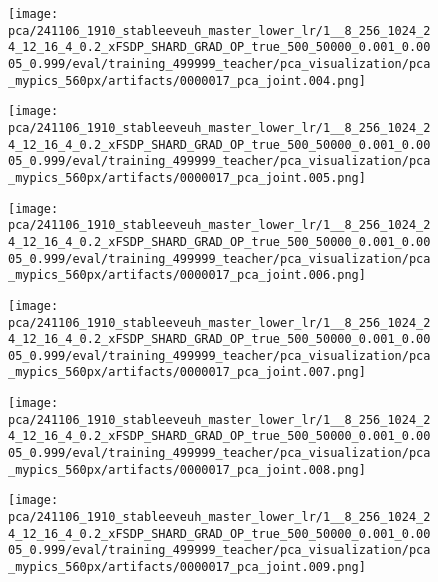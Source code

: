 \begin{figure*}[p]
\begin{subfigure}[t]{0.097\textwidth}
    \end{subfigure}\hfill
    \begin{subfigure}[t]{0.097\textwidth}
        \centering
        \texttt{[image: pca/241106\_1910\_stableeveuh\_master\_lower\_lr/1\_\_8\_256\_1024\_24\_12\_16\_4\_0.2\_xFSDP\_SHARD\_GRAD\_OP\_true\_500\_50000\_0.001\_0.0005\_0.999/eval/training\_499999\_teacher/pca\_visualization/pca\_mypics\_560px/artifacts/0000017\_pca\_joint.004.png]}
    \end{subfigure}\hfill
    \begin{subfigure}[t]{0.097\textwidth}
        \centering
        \texttt{[image: pca/241106\_1910\_stableeveuh\_master\_lower\_lr/1\_\_8\_256\_1024\_24\_12\_16\_4\_0.2\_xFSDP\_SHARD\_GRAD\_OP\_true\_500\_50000\_0.001\_0.0005\_0.999/eval/training\_499999\_teacher/pca\_visualization/pca\_mypics\_560px/artifacts/0000017\_pca\_joint.005.png]}
    \end{subfigure}\hfill
    \begin{subfigure}[t]{0.097\textwidth}
        \centering
        \texttt{[image: pca/241106\_1910\_stableeveuh\_master\_lower\_lr/1\_\_8\_256\_1024\_24\_12\_16\_4\_0.2\_xFSDP\_SHARD\_GRAD\_OP\_true\_500\_50000\_0.001\_0.0005\_0.999/eval/training\_499999\_teacher/pca\_visualization/pca\_mypics\_560px/artifacts/0000017\_pca\_joint.006.png]}
    \end{subfigure}\hfill
    \begin{subfigure}[t]{0.097\textwidth}
        \centering
        \texttt{[image: pca/241106\_1910\_stableeveuh\_master\_lower\_lr/1\_\_8\_256\_1024\_24\_12\_16\_4\_0.2\_xFSDP\_SHARD\_GRAD\_OP\_true\_500\_50000\_0.001\_0.0005\_0.999/eval/training\_499999\_teacher/pca\_visualization/pca\_mypics\_560px/artifacts/0000017\_pca\_joint.007.png]}
    \end{subfigure}\hfill
    \begin{subfigure}[t]{0.097\textwidth}
        \centering
        \texttt{[image: pca/241106\_1910\_stableeveuh\_master\_lower\_lr/1\_\_8\_256\_1024\_24\_12\_16\_4\_0.2\_xFSDP\_SHARD\_GRAD\_OP\_true\_500\_50000\_0.001\_0.0005\_0.999/eval/training\_499999\_teacher/pca\_visualization/pca\_mypics\_560px/artifacts/0000017\_pca\_joint.008.png]}
    \end{subfigure}\hfill
    \begin{subfigure}[t]{0.097\textwidth}
        \centering
        \texttt{[image: pca/241106\_1910\_stableeveuh\_master\_lower\_lr/1\_\_8\_256\_1024\_24\_12\_16\_4\_0.2\_xFSDP\_SHARD\_GRAD\_OP\_true\_500\_50000\_0.001\_0.0005\_0.999/eval/training\_499999\_teacher/pca\_visualization/pca\_mypics\_560px/artifacts/0000017\_pca\_joint.009.png]}

\end{subfigure}
\end{figure*}
